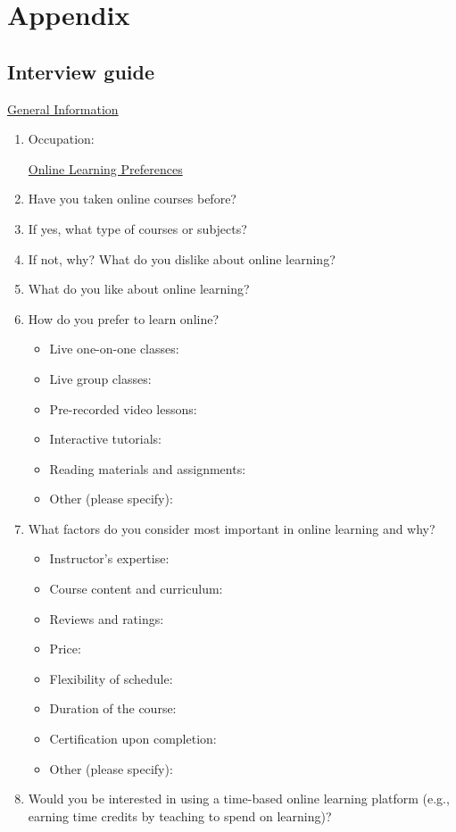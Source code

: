\chapter{Appendix}\label{ch:appendix}

\section{Interview guide}\label{sec:interview-guide}

\underline{General Information}
\begin{enumerate}
\item Occupation:

\underline{Online Learning Preferences}
\item Have you taken online courses before?
\item If yes, what type of courses or subjects?
\item If not, why?
What do you dislike about online learning?
\item What do you like about online learning?
\item How do you prefer to learn online?

\begin{itemize}
\item Live one-on-one classes:
\item Live group classes:
\item Pre-recorded video lessons:
\item Interactive tutorials:
\item Reading materials and assignments:
\item Other (please specify):
\end{itemize}

\item What factors do you consider most important in online learning and why?
\begin{itemize}
\item Instructor's expertise:
\item Course content and curriculum:
\item Reviews and ratings:
\item Price:
\item Flexibility of schedule:
\item Duration of the course:
\item Certification upon completion:
\item Other (please specify):
\end{itemize}
\item Would you be interested in using a time-based online learning platform (e.g., earning time credits by teaching to spend on learning)?


\end{enumerate}
